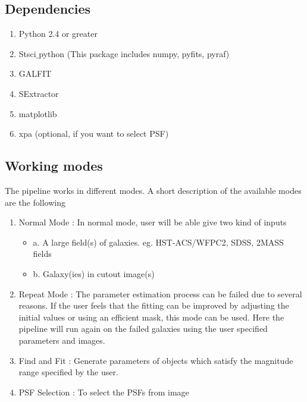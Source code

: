 \documentclass[a4paper,10pt]{article}
\begin{document}
\subsection{Dependencies}
\begin{enumerate}
 \item Python 2.4 or greater
 \item Stsci$\_$python (This package includes numpy, pyfits, pyraf)
 \item GALFIT
 \item SExtractor
 \item matplotlib
 \item xpa (optional, if you want to select PSF)
\end{enumerate}

\subsection{Working modes}
The pipeline works in different modes. A short description of the available modes are the following
\begin{enumerate}
 \item Normal Mode : In normal mode, user will be able give two kind of inputs
\begin{itemize}
\item 
a. A large field(s) of galaxies. eg. HST-ACS/WFPC2, SDSS, 2MASS fields
\item
b. Galaxy(ies) in cutout image(s)
\end{itemize}

\item Repeat Mode : The parameter estimation process can be failed due to several reasons. If the user feels that the fitting can be improved by adjusting the initial values or using an efficient mask, this mode can be used. Here the pipeline will run again on the failed galaxies using the user specified parameters and images. %
\item Find and Fit : Generate parameters of objects which satisfy the magnitude range specified by the user.

\item PSF Selection : To select the PSFs from image

\end{enumerate}
\end{document}
